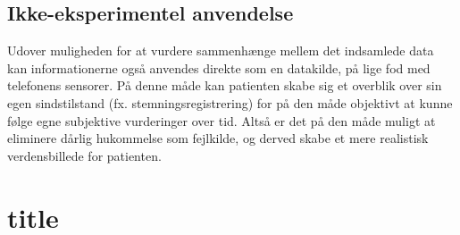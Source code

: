 \subsection{Ikke-eksperimentel anvendelse}
Udover muligheden for at vurdere sammenhænge mellem det indsamlede data kan informationerne også anvendes direkte som en datakilde, på lige fod med telefonens sensorer.
På denne måde kan patienten skabe sig et overblik over sin egen sindstilstand (fx. stemningsregistrering) for på den måde objektivt at kunne følge egne subjektive vurderinger over tid.
Altså er det på den måde muligt at eliminere dårlig hukommelse som fejlkilde, og derved skabe et mere realistisk verdensbillede for patienten.

\section{title}
